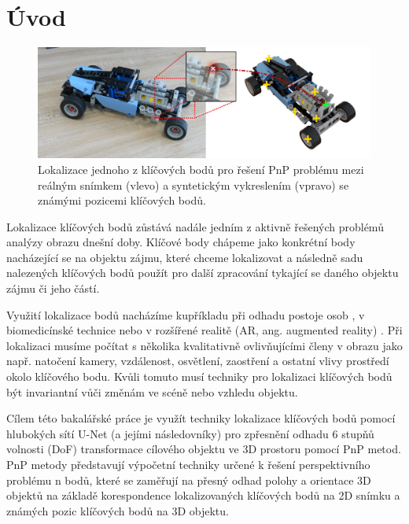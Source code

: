 \chapter{Úvod}
\label{sec:Introduction}

\begin{figure}[H]
\centering
\includegraphics[width=1.0\textwidth,keepaspectratio]{Figures/bp_uvodni_obrazek.jpg}
\caption[Lokalizace klíčového bodu pro řešení PnP problému]{Lokalizace jednoho z klíčových bodů pro řešení PnP problému mezi reálným snímkem (vlevo) a syntetickým vykreslením (vpravo) se známými pozicemi klíčových bodů.}
\label{fig:bp_uvodni_obrazek}
\end{figure}


Lokalizace klíčových bodů zůstává nadále jedním z aktivně řešených problémů analýzy obrazu dnešní doby.
Klíčové body chápeme jako konkrétní body nacházející se na objektu zájmu, které chceme lokalizovat a následně sadu nalezených klíčových bodů použít pro další zpracování tykající se daného objektu zájmu či jeho částí.

Využití lokalizace bodů nacházíme kupříkladu při odhadu postoje osob \cite{humanpose}, v biomedicínské technice \cite{unet} nebo v rozšířené realitě (AR, ang. augmented reality) \cite{ar_pnp}.
Při lokalizaci musíme počítat s několika kvalitativně ovlivňujícími členy v obrazu jako např. natočení kamery, vzdálenost, osvětlení, zaostření a ostatní vlivy prostředí okolo klíčového bodu. Kvůli tomuto musí techniky pro lokalizaci klíčových bodů být invariantní vůči změnám ve scéně nebo vzhledu objektu.

Cílem této bakalářské práce je využít techniky lokalizace klíčových bodů pomocí hlubokých sítí U-Net (a jejími následovníky) pro zpřesnění odhadu 6 stupňů volnosti (DoF) transformace cílového objektu ve 3D prostoru pomocí PnP metod. PnP metody představují výpočetní techniky určené k řešení perspektivního problému n bodů, které se zaměřují na přesný odhad polohy a orientace 3D objektů na základě korespondence lokalizovaných klíčových bodů na 2D snímku a známých pozic klíčových bodů na 3D objektu.

